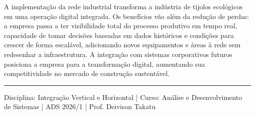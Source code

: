 \documentclass[12pt,a4paper]{article}
\begin{document}
A implementação da rede industrial transforma a indústria de tijolos ecológicos em
uma operação digital integrada. Os benefícios vão além da redução de perdas: a empresa
passa a ter visibilidade total do processo produtivo em tempo real, capacidade de
tomar decisões baseadas em dados históricos e condições para crescer de forma
escalável, adicionando novos equipamentos e áreas à rede sem redesenhar a infraestrutura.
A integração com sistemas corporativos futuros posiciona a empresa para a transformação
digital, aumentando sua competitividade no mercado de construção sustentável.

\vspace{20pt}
\hrule
\vspace{6pt}
{\small\textcolor{medgray}{
Disciplina: Integração Vertical e Horizontal \quad|\quad
Curso: Análise e Desenvolvimento de Sistemas \quad|\quad
ADS 2026/1 \quad|\quad
Prof. Deivison Takatu
}}
\end{document}
